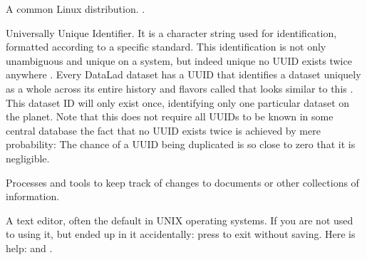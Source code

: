 \begin{description}
\sphinxAtStartPar
A common Linux distribution. .

\sphinxAtStartPar
Universally Unique Identifier. It is a character string used for 
identification, formatted according to a specific standard. This
identification is not only unambiguous and unique on a system, but indeed 
unique \textendash{} no UUID exists twice anywhere .
Every DataLad dataset has a UUID that identifies a dataset uniquely as a whole across
its entire history and flavors called {\hyperref[\detokenize{glossary:term-dataset-ID}]{}} that looks similar to
this . This dataset ID will only exist once,
identifying only one particular dataset on the planet. Note that this does not
require all UUIDs to be known in some central database \textendash{} the fact that no UUID
exists twice is achieved by mere probability: The chance of a UUID being duplicated
is so close to zero that it is negligible.

\sphinxAtStartPar
Processes and tools to keep track of changes to documents or other collections of information.

\ignorespaces 
\sphinxAtStartPar
A text editor, often the default in UNIX operating systems. If you are not used to using it,
but ended up in it accidentally: press  \sphinxcode{\sphinxupquote{:}}  \sphinxcode{\sphinxupquote{!}}  to exit without saving.
Here is help:  and
.


\end{description}
